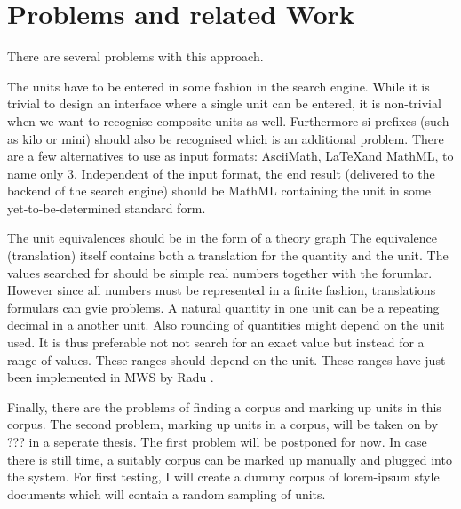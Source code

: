 \documentclass[11pt]{article}
\begin{document}
\section{Problems and related Work}
\label{sec:problems_relatedwork}

There are several problems with this approach. 

The units have to be entered in some fashion in the search engine. While it is trivial to design an interface where a single unit can be entered, it is non-trivial when we want to recognise composite units as well. Furthermore si-prefixes (such as kilo or mini) should also be recognised which is an additional problem. There are a few alternatives to use as input formats: AsciiMath, \LaTeX and MathML, to name only 3. Independent of the input format, the end result (delivered to the backend of the search engine) should be MathML containing the unit in some yet-to-be-determined standard form.

The unit equivalences should be in the form of a theory graph  The equivalence
(translation) itself contains both a translation for the quantity and the unit. The values searched for should be simple real numbers together with the forumlar. However since all numbers must be represented in a finite fashion, translations formulars can gvie problems. A natural quantity in one unit can be a repeating decimal in a another unit. Also rounding of quantities might depend on the unit used. It is thus preferable not not search for an exact value but instead for a range of values. These ranges should depend on the unit. These ranges have just been implemented in MWS by Radu .  

Finally, there are the problems of finding a corpus and marking up units in this corpus. The second problem, marking up units in a corpus, will be taken on by ??? in a seperate thesis. The first problem will be postponed for now. In case there is still time, a suitably corpus can be marked up manually and plugged into the system. For first testing, I will create a dummy corpus of lorem-ipsum style documents which will contain a random sampling of units.


{}

\end{document}

